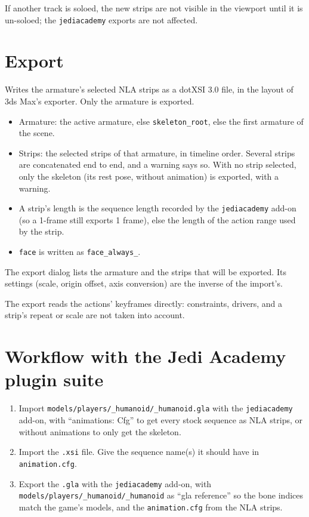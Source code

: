 \documentclass[a4paper,10pt]{article}
\begin{document}
 If another track is soloed, the new strips are not visible in the viewport until it is un-soloed;
 the \texttt{jediacademy} exports are not affected.

 \section{Export}

 Writes the armature's selected NLA strips as a dotXSI 3.0 file, in the layout of 3ds Max's
 exporter. Only the armature is exported.

 \begin{itemize}
  \item Armature: the active armature, else \texttt{skeleton\_root}, else the first armature of the
  scene.
  \item Strips: the selected strips of that armature, in timeline order. Several strips are
  concatenated end to end, and a warning says so. With no strip selected, only the skeleton (its rest
  pose, without animation) is exported, with a warning.
  \item A strip's length is the sequence length recorded by the \texttt{jediacademy} add-on (so a
  1-frame still exports 1 frame), else the length of the action range used by the strip.
  \item \texttt{face} is written as \texttt{face\_always\_}.
 \end{itemize}

 The export dialog lists the armature and the strips that will be exported. Its settings (scale,
 origin offset, axis conversion) are the inverse of the import's.

 The export reads the actions' keyframes directly: constraints, drivers, and a strip's repeat or
 scale are not taken into account.

 \section{Workflow with the Jedi Academy plugin suite}

 \begin{enumerate}
  \item Import \texttt{models/players/\_humanoid/\_humanoid.gla} with the \texttt{jediacademy}
  add-on, with ``animations: Cfg'' to get every stock sequence as NLA strips, or without animations
  to only get the skeleton.
  \item Import the \texttt{.xsi} file. Give the sequence name(s) it should have in
  \texttt{animation.cfg}.
  \item Export the \texttt{.gla} with the \texttt{jediacademy} add-on, with
  \texttt{models/players/\_humanoid/\_humanoid} as ``gla reference'' so the bone indices match the
  game's models, and the \texttt{animation.cfg} from the NLA strips.
 \end{enumerate}
\end{document}
